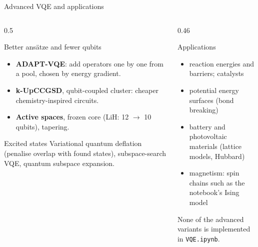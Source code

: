 \documentclass[aspectratio=169,11pt]{beamer}
\newcommand{\key}[1]{{\color{qdark}\textbf{#1}}}
\begin{document}
\begin{frame}{Advanced VQE and applications}
  \scriptsize
  \begin{columns}[T]
    \begin{column}{0.5\textwidth}
      \begin{block}{Better ansätze and fewer qubits}
        \begin{itemize}
          \item \key{ADAPT-VQE}: add operators one by one from a pool, chosen by energy gradient.
          \item \key{k-UpCCGSD}, qubit-coupled cluster: cheaper chemistry-inspired circuits.
          \item \key{Active spaces}, frozen core (LiH: 12 $\to$ 10 qubits), tapering.
        \end{itemize}
      \end{block}
      \begin{block}{Excited states}
        Variational quantum deflation (penalise overlap with found states), subspace-search VQE, quantum subspace expansion.
      \end{block}
    \end{column}
    \begin{column}{0.46\textwidth}
      \begin{block}{Applications}
        \begin{itemize}
          \item reaction energies and barriers; catalysts
          \item potential energy surfaces (bond breaking)
          \item battery and photovoltaic materials (lattice models, Hubbard)
          \item magnetism: spin chains such as the notebook's Ising model
        \end{itemize}
      \end{block}
      None of the advanced variants is implemented in \texttt{VQE.ipynb}.
    \end{column}
  \end{columns}
\end{frame}
\end{document}
